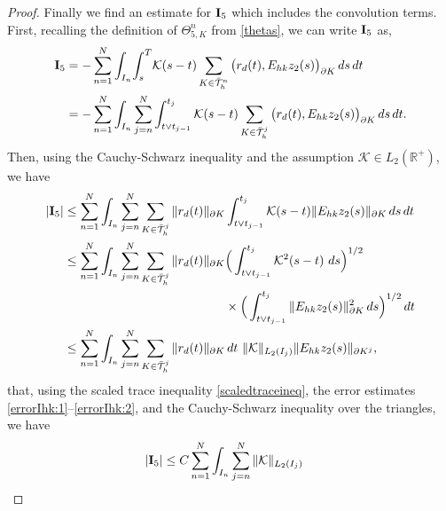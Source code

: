 \documentclass{amsart}
\numberwithin{equation}{section}
\theoremstyle{definition}
\begin{document}
\begin{proof}
Finally we find an estimate for ${\rm{\bf I}}_5$ which includes the convolution terms. 
First, recalling the definition of $\Theta_{5,K}^n$ from \eqref{thetas}, 
we can write ${\rm{\bf I}}_5$ as,
\begin{equation*}   
  \begin{split}
    {\rm{\bf I}}_5
    &=-\sum_{n=1}^N\int_{I_n}\!\int_s^T\! {\mathcal K}(s-t)\sum_{K\in\bar{\mathcal T}_h^n}
      \big(r_d(t),E_{hk}z_2(s)\big)_{\partial K}\,ds\,dt \\
    &=-\sum_{n=1}^N\int_{I_n}\sum_{j=n}^N\int_{t\vee t_{j-1}}^{t_j} 
      {\mathcal K}(s-t)\sum_{K\in\bar{\mathcal T}_h^j}
      \big(r_d(t),E_{hk}z_2(s)\big)_{\partial K}\,ds\,dt .
  \end{split}
\end{equation*}
Then, using the Cauchy-Schwarz inequality and the assumption 
${\mathcal K} \in L_2(\mathbb{R}^+)$, we have
\begin{equation*} 
  \begin{split}
   | {\rm{\bf I}}_5 |
    &\leq \sum_{n=1}^N\int_{I_n}\sum_{j=n}^N\sum_{K\in\bar{\mathcal T}_h^j}
      \|r_d(t)\|_{\partial K} 
      \int_{t\vee t_{j-1}}^{t_j} {\mathcal K}(s-t) \|E_{hk}z_2(s)\|_{\partial K}\,ds\,dt \\
    &\leq \sum_{n=1}^N\int_{I_n}\sum_{j=n}^N\sum_{K\in\bar{\mathcal T}_h^j}
      \|r_d(t)\|_{\partial K}
      \Big(\int_{t\vee t_{j-1}}^{t_j} {\mathcal K}^2(s-t)\ ds\Big)^{1/2}\\
    &\qquad\qquad\qquad\qquad\qquad\qquad\quad \times 
     \Big( \int_{t\vee t_{j-1}}^{t_j} \|E_{hk}z_2(s)\|_{\partial K}^2\,ds\Big)^{1/2}\,dt \\
    &\leq \sum_{n=1}^N\int_{I_n}\sum_{j=n}^N\sum_{K\in\bar{\mathcal T}_h^j}
      \|r_d(t)\|_{\partial K} \,dt \ \|{\mathcal K}\|_{L_2(I_j)}
      \|E_{hk}z_2(s)\|_{\partial K^j},
  \end{split}
\end{equation*}
that,  using the scaled trace inequality \eqref{scaledtraceineq}, 
the error estimates \eqref{errorIhk:1}--\eqref{errorIhk:2}, 
and the Cauchy-Schwarz inequality over the triangles, we have
\begin{equation*}   
  \begin{split}
   | {\rm{\bf I}}_5 |
     &\leq C \sum_{n=1}^N\int_{I_n}\sum_{j=n}^N
      \|{\mathcal K}\|_{L_2(I_j)}
     

\end{split}
\end{equation*}
\end{proof}
\end{document}
